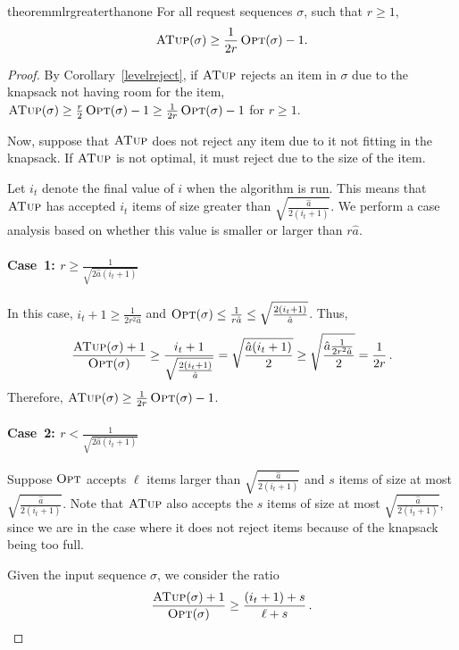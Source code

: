 \documentclass[a4paper,UKenglish,cleveref, autoref, thm-restate]{lipics-v2021}
\newcommand{\OPT}{\ensuremath{\operatorname{\textsc{Opt}}}\xspace}
\newcommand{\MLB}{\ensuremath{\operatorname{\textsc{ATup}}}\xspace}
\newcommand{\guess}{\ensuremath{\hat{a}}\xspace}
\begin{document}
\begin{restatable}{theorem}{mlrgreaterthanone}
  \label{thm:mlrgreaterthanone}
  For all request sequences $\sigma$, such that $r\geq 1$,
  $$\MLB(\sigma)
  \geq \frac{1}{2r}\OPT(\sigma)-1.$$
\end{restatable}
\begin{proof}
  By Corollary~\ref{levelreject}, if \MLB rejects an item in $\sigma$
  due to the knapsack not having room for the item,
  $\MLB(\sigma) \geq \frac{r}{2}\OPT(\sigma)-1\geq
  \frac{1}{2r}\OPT(\sigma)-1$ for $r\geq 1$.

  Now, suppose that \MLB does not reject any item due to it not
  fitting in the knapsack. If \MLB is not optimal, it must reject due to
  the size of the item.

  Let $i_t$ denote the final value of $i$ when the algorithm is run.
  This means that \MLB has accepted $i_t$ items of size greater than
  $\sqrt{\frac{\guess}{2(i_t+1)}}$. We perform a case analysis based on
  whether this value is smaller or larger than $r\guess$.


\paragraph*{Case~1: $r\geq \frac{1}{\sqrt{2\guess(i_t+1)}}$}
In this case, $i_t+1\geq \frac{1}{2r^2\guess}$ and $\OPT(\sigma) \leq
\frac{1}{r\guess} \leq \sqrt{\frac{2(i_t+1)}{\guess}}$.
Thus,
  \[
     \frac{\MLB(\sigma)+1}{\OPT(\sigma)}
  \geq
  \frac{i_t+1}{\sqrt{\frac{2(i_t+1)}{\guess}}}  = \sqrt{\frac{\guess(i_t+1)}{2}}
  \geq \sqrt{\frac{\guess\frac{1}{2r^2\guess}}{2}}=\frac{1}{2r}\,.
\]
  Therefore,  $\MLB(\sigma)
  \geq \frac{1}{2r}\OPT(\sigma)-1$.


\paragraph*{Case~2: $r<\frac{1}{\sqrt{2\guess(i_t+1)}}$}

  Suppose \OPT accepts $\ell$ items larger than
  $\sqrt{\frac{\guess}{2(i_t+1)}}$ and $s$ items of size at most
  $\sqrt{\frac{\guess}{2(i_t+1)}}$.  Note that \MLB also accepts the $s$
  items of size at most $\sqrt{\frac{\guess}{2(i_t+1)}}$, since we are in
  the case where it does not reject items because of the knapsack
  being too full.
 
  Given the input sequence $\sigma$, we consider the ratio
\[
     \frac{\MLB(\sigma)+1}{\OPT(\sigma)}
  \geq
  \frac{(i_t+1)+s}{\ell+s}\,.
\]


\end{proof}
\end{document}
